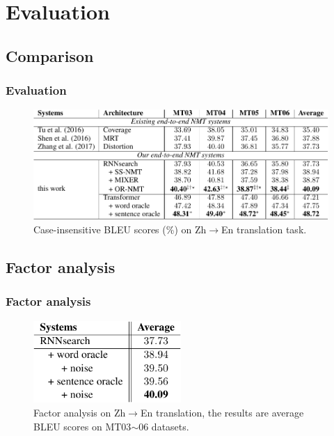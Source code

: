 \documentclass{beamer}
\begin{document}

\section{Evaluation}

\subsection{Comparison}

\begin{frame}
    \frametitle{Evaluation}
    \begin{figure}
        \centering
        \includegraphics[width=\textwidth]{fig/bleu_table}
        \caption{
            Case-insensitive BLEU scores (\%) on Zh$\rightarrow$En translation task. %
        }
    \end{figure}
\end{frame}


\subsection{Factor analysis}

\begin{frame}
    \frametitle{Factor analysis}
    \begin{figure}
        \centering
        \includegraphics[width=0.5\textwidth]{fig/factor_analysis_table.pdf}
        \caption{Factor analysis on Zh$\rightarrow$En translation, the results are average BLEU scores on MT03$\sim$06 datasets.}
    \end{figure} 
\end{frame}
\end{document}
